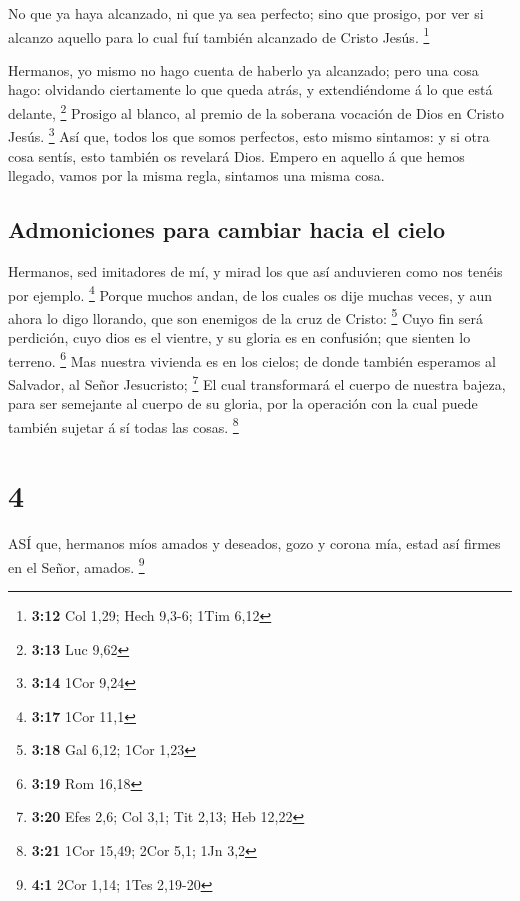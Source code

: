  No que ya haya alcanzado, ni que ya sea perfecto; sino que
prosigo, por ver si alcanzo aquello para lo cual fuí también alcanzado
de Cristo Jesús. \footnote{\textbf{3:12} Col 1,29; Hech 9,3-6; 1Tim 6,12}

 Hermanos, yo mismo no hago cuenta de haberlo ya alcanzado;
pero una cosa hago: olvidando ciertamente lo que queda atrás, y
extendiéndome á lo que está delante, \footnote{\textbf{3:13} Luc 9,62}
 Prosigo al blanco, al premio de la soberana vocación de
Dios en Cristo Jesús. \footnote{\textbf{3:14} 1Cor 9,24} 
Así que, todos los que somos perfectos, esto mismo sintamos: y si otra
cosa sentís, esto también os revelará Dios.  Empero en
aquello á que hemos llegado, vamos por la misma regla, sintamos una
misma cosa.

\hypertarget{admoniciones-para-cambiar-hacia-el-cielo}{%
\subsection{Admoniciones para cambiar hacia el
cielo}\label{admoniciones-para-cambiar-hacia-el-cielo}}

 Hermanos, sed imitadores de mí, y mirad los que así
anduvieren como nos tenéis por ejemplo. \footnote{\textbf{3:17} 1Cor
  11,1}  Porque muchos andan, de los cuales os dije muchas
veces, y aun ahora lo digo llorando, que son enemigos de la cruz de
Cristo: \footnote{\textbf{3:18} Gal 6,12; 1Cor 1,23}  Cuyo
fin será perdición, cuyo dios es el vientre, y su gloria es en
confusión; que sienten lo terreno. \footnote{\textbf{3:19} Rom 16,18}
 Mas nuestra vivienda es en los cielos; de donde también
esperamos al Salvador, al Señor Jesucristo; \footnote{\textbf{3:20} Efes
  2,6; Col 3,1; Tit 2,13; Heb 12,22}  El cual transformará
el cuerpo de nuestra bajeza, para ser semejante al cuerpo de su gloria,
por la operación con la cual puede también sujetar á sí todas las cosas.
\footnote{\textbf{3:21} 1Cor 15,49; 2Cor 5,1; 1Jn 3,2}

\hypertarget{section-3}{%
\section{4}\label{section-3}}

 ASÍ que, hermanos míos amados y deseados, gozo y corona
mía, estad así firmes en el Señor, amados. \footnote{\textbf{4:1} 2Cor
  1,14; 1Tes 2,19-20}

